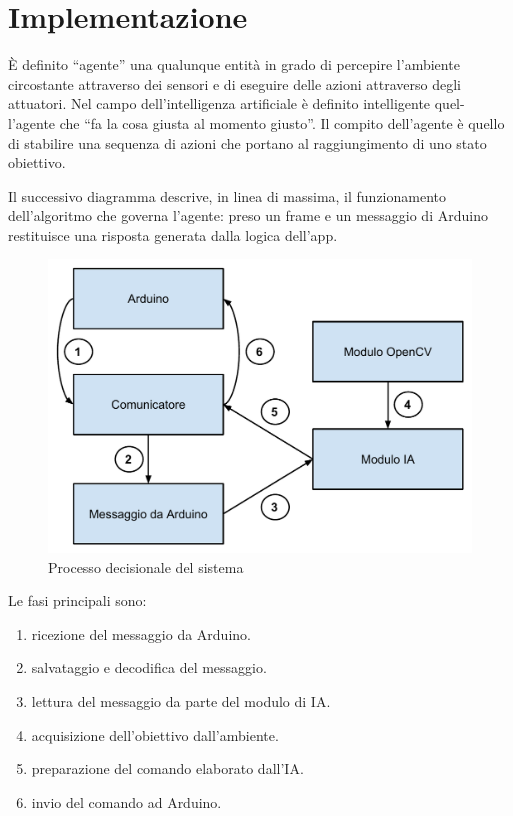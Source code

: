 \chapter{Implementazione}
\fancyfoot[C]{\thepage }
È definito ``agente'' una qualunque entità in grado di percepire l'ambiente
circostante attraverso dei sensori e di eseguire delle azioni attraverso degli
attuatori. Nel campo dell'intelligenza artificiale è definito intelligente quel-
l'agente che ``fa la cosa giusta al momento giusto''. Il compito dell'agente è
quello di stabilire una sequenza di azioni che portano al raggiungimento di
uno stato obiettivo.\cite{agente}

Il successivo diagramma descrive, in linea di massima, il funzionamento dell'algoritmo che governa l'agente: preso un frame e un messaggio
di Arduino restituisce una risposta generata dalla logica dell'app.
\begin{figure}[H] \center
\includegraphics[width=\textwidth]{immagini/schema_processo_new.pdf}
\caption{Processo decisionale del sistema} 
\end{figure}
Le fasi principali sono:
\begin{enumerate}
\item ricezione del messaggio da Arduino.
\item salvataggio e decodifica del messaggio.
\item lettura del messaggio da parte del modulo di IA.
\item acquisizione dell'obiettivo dall'ambiente.
\item preparazione del comando elaborato dall'IA.
\item invio del comando ad Arduino.
\end{enumerate}

